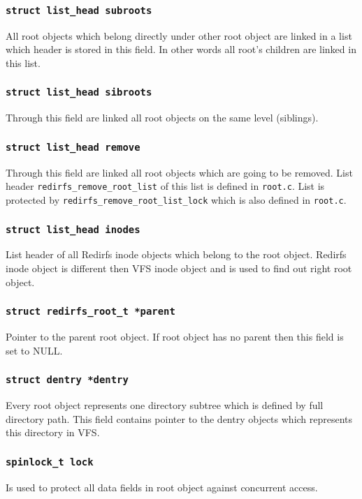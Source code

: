\subsubsection{\texttt{struct list\_head subroots}}
All root objects which belong directly under other root object are linked in a list
which header is stored in this field. In other words all root's children are linked
in this list.

\subsubsection{\texttt{struct list\_head sibroots}}
Through this field are linked all root objects on the same level (siblings).

\subsubsection{\texttt{struct list\_head remove}}
Through this field are linked all root objects which are going to be removed. List
header \texttt{redirfs\_remove\_root\_list} of this list is defined in
\texttt{root.c}. List is protected by \texttt{redirfs\_remove\_root\_list\_lock} which
is also defined in \texttt{root.c}.

\subsubsection{\texttt{struct list\_head inodes}}
List header of all Redirfs inode objects which belong to the root object. Redirfs inode
object is different then VFS inode object and is used to find out right root object.

\subsubsection{\texttt{struct redirfs\_root\_t *parent}}
Pointer to the parent root object. If root object has no parent then this field is set
to NULL.

\subsubsection{\texttt{struct dentry *dentry}}
Every root object represents one directory subtree which is defined by full directory
path. This field contains pointer to the dentry objects which represents this
directory in VFS.

\subsubsection{\texttt{spinlock\_t lock}}
Is used to protect all data fields in root object against concurrent access.

